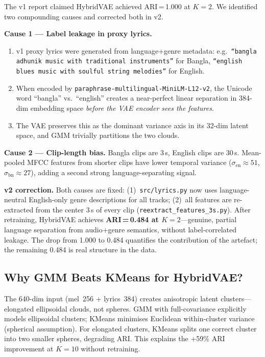 \documentclass{article}
\begin{document}
The v1 report claimed HybridVAE achieved ARI\,=\,1.000 at $K\!=\!2$. We identified
two compounding causes and corrected both in v2.

\textbf{Cause 1 --- Label leakage in proxy lyrics.}
\begin{enumerate}
    \item v1 proxy lyrics were generated from language+genre metadata: e.g.\
          \texttt{``bangla adhunik music with traditional instruments''} for Bangla,
          \texttt{``english blues music with soulful string melodies''} for English.
    \item When encoded by \texttt{paraphrase-multilingual-MiniLM-L12-v2}, the Unicode
          word ``bangla'' vs.\ ``english'' creates a near-perfect linear separation in
          384-dim embedding space \emph{before the VAE encoder sees the features}.
    \item The VAE preserves this as the dominant variance axis in its 32-dim latent
          space, and GMM trivially partitions the two clouds.
\end{enumerate}

\textbf{Cause 2 --- Clip-length bias.}
Bangla clips are 3\,s, English clips are 30\,s. Mean-pooled MFCC features from shorter
clips have lower temporal variance ($\sigma_\text{en}\!\approx\!51$,
$\sigma_\text{bn}\!\approx\!27$), adding a second strong language-separating signal.

\textbf{v2 correction.}
Both causes are fixed: (1)~\texttt{src/lyrics.py} now uses language-neutral English-only
genre descriptions for all tracks; (2)~all features are re-extracted from the center 3\,s
of every clip (\texttt{reextract\_features\_3s.py}). After retraining, HybridVAE achieves
\textbf{ARI\,=\,0.484 at $K\!=\!2$}---genuine, partial language separation from audio+genre
semantics, without label-correlated leakage. The drop from 1.000 to 0.484 quantifies
the contribution of the artefact; the remaining 0.484 is real structure in the data.

\subsection{Why GMM Beats KMeans for HybridVAE?}

The 640-dim input (mel~256 + lyrics~384) creates anisotropic latent clusters---elongated
ellipsoidal clouds, not spheres. GMM with full-covariance explicitly models ellipsoidal
clusters; KMeans minimises Euclidean within-cluster variance (spherical assumption).
For elongated clusters, KMeans splits one correct cluster into two smaller spheres,
degrading ARI. This explains the +59\% ARI improvement at $K\!=\!10$ without retraining.
\end{document}
